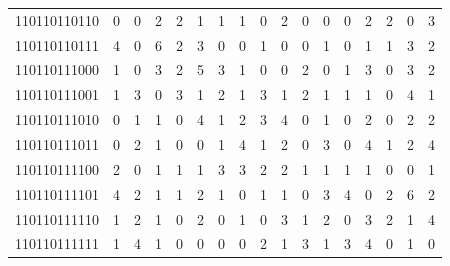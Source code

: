 \documentclass[10pt,a4paper]{article}
\begin{document}
\begin{longtable}{ |c|c|c|c|c|c|c|c|c|c|c|c|c|c|c|c|c| }
    110110110110              & 0                            & 0                                & 2                            & 2                              & 1   & 1   & 1   & 0   & 2   & 0   & 0   & 0   & 2   & 2   & 0   & 3   \\
    110110110111              & 4                            & 0                                & 6                            & 2                              & 3   & 0   & 0   & 1   & 0   & 0   & 1   & 0   & 1   & 1   & 3   & 2   \\
    110110111000              & 1                            & 0                                & 3                            & 2                              & 5   & 3   & 1   & 0   & 0   & 2   & 0   & 1   & 3   & 0   & 3   & 2   \\
    110110111001              & 1                            & 3                                & 0                            & 3                              & 1   & 2   & 1   & 3   & 1   & 2   & 1   & 1   & 1   & 0   & 4   & 1   \\
    110110111010              & 0                            & 1                                & 1                            & 0                              & 4   & 1   & 2   & 3   & 4   & 0   & 1   & 0   & 2   & 0   & 2   & 2   \\
    110110111011              & 0                            & 2                                & 1                            & 0                              & 0   & 1   & 4   & 1   & 2   & 0   & 3   & 0   & 4   & 1   & 2   & 4   \\
    110110111100              & 2                            & 0                                & 1                            & 1                              & 1   & 3   & 3   & 2   & 2   & 1   & 1   & 1   & 1   & 0   & 0   & 1   \\
    110110111101              & 4                            & 2                                & 1                            & 1                              & 2   & 1   & 0   & 1   & 1   & 0   & 3   & 4   & 0   & 2   & 6   & 2   \\
    110110111110              & 1                            & 2                                & 1                            & 0                              & 2   & 0   & 1   & 0   & 3   & 1   & 2   & 0   & 3   & 2   & 1   & 4   \\
    110110111111              & 1                            & 4                                & 1                            & 0                              & 0   & 0   & 0   & 2   & 1   & 3   & 1   & 3   & 4   & 0   & 1   & 0   \\

\end{longtable}
\end{document}
